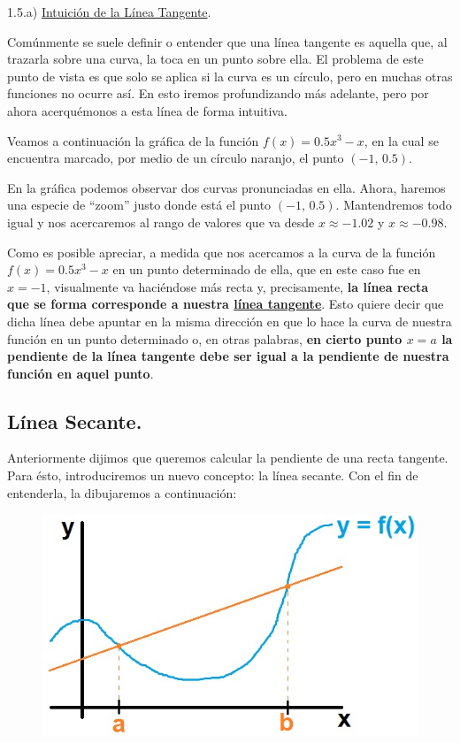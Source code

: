 \documentclass[12pt]{article}
\begin{document}
\newpage

1.5.a) \underline{Intuición de la Línea Tangente}.

Comúnmente se suele definir o entender que una línea tangente es aquella que, al trazarla sobre una curva, la toca en un punto sobre ella. El problema de este punto de vista es que solo se aplica si la curva es un círculo, pero en muchas otras funciones no ocurre así. En esto iremos profundizando más adelante, pero por ahora acerquémonos a esta línea de forma intuitiva.

Veamos a continuación la gráfica de la función $f(x) = 0.5x^{3}-x$, en la cual se encuentra marcado, por medio de un círculo naranjo, el punto $(-1, \, 0.5)$.

En la gráfica podemos observar dos curvas pronunciadas en ella. Ahora, haremos una especie de ``zoom'' justo donde está el punto $(-1, \, 0.5)$. Mantendremos todo igual y nos acercaremos al rango de valores que va desde $x \approx -1.02$ y $x \approx -0.98$.

Como es posible apreciar, a medida que nos acercamos a la curva de la función $f(x) = 0.5x^{3}-x$ en un punto determinado de ella, que en este caso fue en $x = -1$, visualmente va haciéndose más recta y, precisamente, \textbf{la línea recta que se forma corresponde a nuestra \underline{línea tangente}}. Esto quiere decir que dicha línea debe apuntar en la misma dirección en que lo hace la curva de nuestra función en un punto determinado o, en otras palabras, \textbf{en cierto punto $x = a$ la pendiente de la línea tangente debe ser igual a la pendiente de nuestra función en aquel punto}.



\subsection{Línea Secante.}

Anteriormente dijimos que queremos calcular la pendiente de una recta tangente. Para ésto, introduciremos un nuevo concepto: la línea secante. Con el fin de entenderla, la dibujaremos a continuación:

\newpage

\begin{figure}[hbt!]
\centering
\includegraphics[scale=0.7]{img/secant_line_intro.jpg}
\end{figure}
\end{document}
